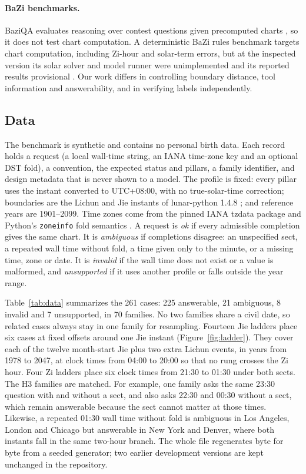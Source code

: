 \documentclass[12pt,letterpaper]{article}
\begin{document}
\paragraph{BaZi benchmarks.} BaziQA evaluates reasoning over contest questions given precomputed charts \citep{baziqa}, so it does not test chart computation. A deterministic BaZi rules benchmark targets chart computation, including Zi-hour and solar-term errors, but at the inspected version its solar solver and model runner were unimplemented and its reported results provisional \citep{detbenchmark}. Our work differs in controlling boundary distance, tool information and answerability, and in verifying labels independently.

\subsection{Data}

The benchmark is synthetic and contains no personal birth data. Each record holds a request (a local wall-time string, an IANA time-zone key and an optional DST fold), a convention, the expected status and pillars, a family identifier, and design metadata that is never shown to a model. The profile is fixed: every pillar uses the instant converted to UTC+08:00, with no true-solar-time correction; boundaries are the Lichun and Jie instants of lunar-python 1.4.8 \citep{lunar}; and reference years are 1901--2099. Time zones come from the pinned IANA tzdata package and Python's \texttt{zoneinfo} fold semantics \citep{zoneinfo}. A request is \emph{ok} if every admissible completion gives the same chart. It is \emph{ambiguous} if completions disagree: an unspecified sect, a repeated wall time without fold, a time given only to the minute, or a missing time, zone or date. It is \emph{invalid} if the wall time does not exist or a value is malformed, and \emph{unsupported} if it uses another profile or falls outside the year range.

Table~\ref{tab:data} summarizes the 261 cases: 225 answerable, 21 ambiguous, 8 invalid and 7 unsupported, in 70 families. No two families share a civil date, so related cases always stay in one family for resampling. Fourteen Jie ladders place six cases at fixed offsets around one Jie instant (Figure~\ref{fig:ladder}). They cover each of the twelve month-start Jie plus two extra Lichun events, in years from 1978 to 2047, at clock times from 04:00 to 20:00 so that no rung crosses the Zi hour. Four Zi ladders place six clock times from 21:30 to 01:30 under both sects. The H3 families are matched. For example, one family asks the same 23:30 question with and without a sect, and also asks 22:30 and 00:30 without a sect, which remain answerable because the sect cannot matter at those times. Likewise, a repeated 01:30 wall time without fold is ambiguous in Los Angeles, London and Chicago but answerable in New York and Denver, where both instants fall in the same two-hour branch. The whole file regenerates byte for byte from a seeded generator; two earlier development versions are kept unchanged in the repository.
\end{document}
